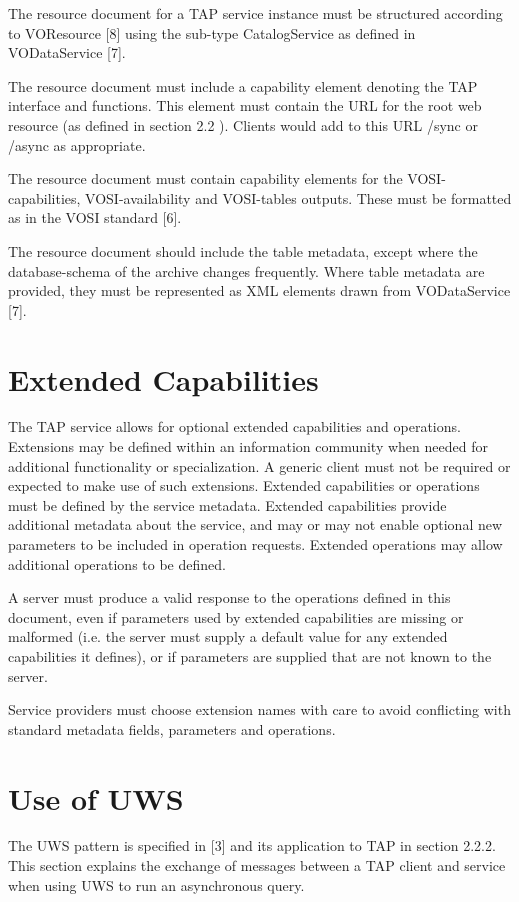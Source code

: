 \documentclass[11pt,a4paper]{ivoa}
\begin{document}
The resource document for a TAP service instance must be structured according to 
VOResource [8] using the sub-type CatalogService as defined in VODataService 
[7].

The resource document must include a capability element denoting the TAP 
interface and functions. This element must contain the URL for the root web 
resource (as defined in section 2.2 ). Clients would add to this URL /sync or 
/async as appropriate.

The resource document must contain capability elements for the 
VOSI-capabilities, VOSI-availability and VOSI-tables outputs. These must be 
formatted as in the VOSI standard [6].

The resource document should include the table metadata, except where the  
database-schema of the archive changes frequently. Where table metadata are 
provided, they must be represented as XML elements drawn from VODataService 
[7]. 

\section{Extended Capabilities}
The TAP service allows for optional extended capabilities and operations. 
Extensions may be defined within an information community when needed for 
additional functionality or specialization.  A generic client must not be 
required or expected to make use of such extensions.  Extended capabilities or 
operations must be defined by the service metadata. Extended capabilities 
provide additional metadata about the service, and may or may not enable 
optional new parameters to be included in operation requests.  Extended 
operations may allow additional operations to be defined.

A server must produce a valid response to the operations defined in this 
document, even if parameters used by extended capabilities are missing or 
malformed (i.e. the server must supply a default value for any extended 
capabilities it defines), or if parameters are supplied that are not known to 
the server.

Service providers must choose extension names with care to avoid conflicting 
with standard metadata fields, parameters and operations.

\section{Use of UWS}
The UWS pattern is specified in [3] and its application to TAP in section 
2.2.2. This section explains the exchange of messages between a TAP client and 
service when using UWS to run an asynchronous query.
\end{document}
